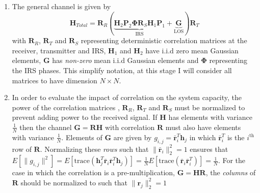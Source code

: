\documentclass[12pt,a4paper]{report}
\begin{document}
\begin{enumerate}
\item 
The general channel is given by 
	\begin{equation}
	\mathbf{H}_{Total} = \mathbf{R}_{R}(\underbrace{\mathbf{H}_{2}\mathbf{P}_{2}\boldsymbol{\Phi}\mathbf{R}_{S}\mathbf{H}_{1}\mathbf{P}_{1}}_{\text{IRS}} + \underbrace{\mathbf{G}}_{\text{LOS}})\mathbf{R}_{T}
	\end{equation}
	with $\mathbf{R}_{R}$, $\mathbf{R}_{T}$ and $\mathbf{R}_{S}$ representing deterministic correlation matrices at the receiver, transmitter and IRS, $\mathbf{H}_{1}$ and $\mathbf{H}_{2}$ have i.i.d zero mean Gaussian elements, $\mathbf{G}$ has \emph{non-zero} mean i.i.d Gaussian elements and $\boldsymbol{\Phi}$ representing the IRS phases.
	This simplify notation, at this stage I will consider all matrices to have dimension $N \times N$. 

\item 
In order to evaluate the impact of correlation on the system capacity, the power of the correlation matrices , $\mathbf{R}_{R}$, $\mathbf{R}_{T}$ and $\mathbf{R}_{S}$ must be normalized to prevent adding power to the received signal.
If $\mathbf{H}$ has elements with variance $\frac{1}{N}$ then the channel $\mathbf{G} = \mathbf{R}\mathbf{H}$ with correlation $\mathbf{R}$ must also have elements with variance $\frac{1}{N}$. Elements of $\mathbf{G}$ are given by  $g_{i,j} = \bar{\mathbf{r}}^T_i \mathbf{h}_j$ in which $\bar{\mathbf{r}}^T_i$ is the $i^{\text{th}}$ row of $\mathbf{R}$.
 Normalizing these \emph{rows} such that $\| \bar{\mathbf{r}}_i \| ^2_2 = 1$ ensures that $E[\|g_{i,j}\|^2] = 
 E[\text{trace}(\mathbf{h}_j^T \bar{\mathbf{r}}_i \bar{\mathbf{r}}^T_i \mathbf{h}_j)] 
 =  \frac{1}{N}E[\text{trace}(\bar{\mathbf{r}}_i \bar{\mathbf{r}}^T_i)]= \frac{1}{N}$.
 For the case in which the correlation is a pre-multiplication, $\mathbf{G} = \mathbf{H}\mathbf{R}$, the \emph{columns} of 
 $\mathbf{R}$ should be normalized to such that  $\|\mathbf{r}_j\| ^2_2 = 1$


\end{enumerate}
\end{document}
